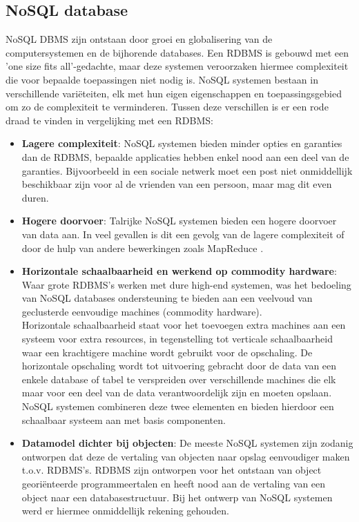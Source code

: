 \subsection{NoSQL database\cite{Strauch.NoSQL}}\label{sec:eventualconsistency}
NoSQL DBMS zijn ontstaan door groei en globalisering van de computersystemen en de bijhorende databases. Een RDBMS is gebouwd met een 'one size fits all'-gedachte, maar deze systemen veroorzaken hiermee complexiteit die voor bepaalde toepassingen niet nodig is. NoSQL systemen bestaan in verschillende variëteiten, elk met hun eigen eigenschappen en toepassingsgebied om zo de complexiteit te verminderen. Tussen deze verschillen is er een rode draad te vinden in vergelijking met een RDBMS:
\begin{itemize}
	\item \textbf{Lagere complexiteit}: NoSQL systemen bieden minder opties en garanties dan de RDBMS, bepaalde applicaties hebben enkel nood aan een deel van de garanties. Bijvoorbeeld in een sociale netwerk moet een post niet onmiddellijk beschikbaar zijn voor al de vrienden van een persoon, maar mag dit even duren.
	\item \textbf{Hogere doorvoer}: Talrijke NoSQL systemen bieden een hogere doorvoer van data aan. In veel gevallen is dit een gevolg van de lagere complexiteit of door de hulp van andere bewerkingen zoals MapReduce \cite{dean2008mapreduce}.
	
	\item \textbf{Horizontale schaalbaarheid en werkend op commodity hardware}: Waar grote RDBMS's werken met dure high-end systemen, was het bedoeling van NoSQL databases ondersteuning te bieden aan een veelvoud van geclusterde eenvoudige machines (commodity hardware). \\
	Horizontale schaalbaarheid staat voor het toevoegen extra machines aan een systeem voor extra resources, in tegenstelling tot verticale schaalbaarheid waar een krachtigere machine wordt gebruikt voor de opschaling. De horizontale opschaling wordt tot uitvoering gebracht door de data van een enkele database of tabel te verspreiden over verschillende machines die elk maar voor een deel van de data verantwoordelijk zijn en moeten opslaan.\\
	NoSQL systemen combineren deze twee elementen en bieden hierdoor een schaalbaar systeem aan met basis componenten.
	\item \textbf{Datamodel dichter bij objecten}: De meeste NoSQL systemen zijn zodanig ontworpen dat deze de vertaling van objecten naar opslag eenvoudiger maken t.o.v. RDBMS's. RDBMS zijn ontworpen voor het ontstaan van object georiënteerde programmeertalen en heeft nood aan de vertaling van een object naar een databasestructuur. Bij het ontwerp van NoSQL systemen werd er hiermee onmiddellijk rekening gehouden.  
\end{itemize}  \noindent
